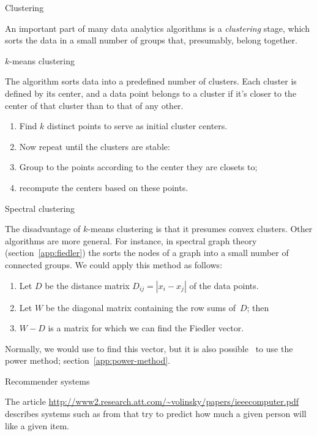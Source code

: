 \def\R{{\cal R}}

 {Clustering}

An important part of many data analytics algorithms
is a \emph{clustering} stage, which sorts the data
in a small number of groups that, presumably, belong together.

 {$k$-means clustering}

The  algorithm sorts data
into a predefined number of clusters. Each cluster is defined by
its center, and a data point belongs to a cluster if it's closer
to the center of that cluster than to that of any other.

\begin{enumerate}
\item Find $k$ distinct points to serve as initial cluster centers.
\item Now repeat until the clusters are stable:
\item Group to the points according to the center they are closets to;
\item recompute the centers based on these points.
\end{enumerate}

 {Spectral clustering}

The disadvantage of $k$-means clustering is that it presumes convex clusters.
Other algorithms are more general. For instance, in spectral graph theory
(section~\ref{app:fiedler}) the  sorts the nodes of a graph
into a small number of connected groups. We could apply this method as follows:
\begin{enumerate}
\item Let $D$ be the distance matrix $D_{ij}=|x_i-x_j|$ of the data points.
\item Let $W$ be the diagonal matrix containing the row sums of~$D$; then
\item $W-D$ is a matrix for which we can find the Fiedler vector.
\end{enumerate}

Normally, we would use  to find this vector,
but it is also possible~\cite{LinCohen:PIC} to use the power method;
section~\ref{app:power-method}.


 {Recommender systems}

The article 
\url{http://www2.research.att.com/~volinsky/papers/ieeecomputer.pdf}
describes systems such as from 
that try to predict how much a given person will like a given item.


